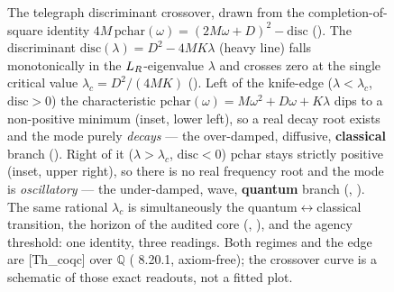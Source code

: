 \begin{figure}[t]
{%
}
\caption{The telegraph discriminant crossover, drawn from the completion-of-square
identity $4M\,\mathrm{pchar}(\omega)=(2M\omega+D)^2-\mathrm{disc}$ ().
The discriminant $\mathrm{disc}(\lambda)=D^2-4MK\lambda$ (heavy line) falls monotonically
in the $L_{R}$-eigenvalue $\lambda$ and crosses zero at the single critical value
$\lambda_c=D^2/(4MK)$ (). Left of the knife-edge
($\lambda<\lambda_c$, $\mathrm{disc}>0$) the characteristic $\mathrm{pchar}(\omega)=M\omega^2+D\omega+K\lambda$
dips to a non-positive minimum (inset, lower left), so a real decay root exists and the
mode purely \emph{decays} --- the over-damped, diffusive, \textbf{classical} branch
(). Right of it ($\lambda>\lambda_c$, $\mathrm{disc}<0$)
$\mathrm{pchar}$ stays strictly positive (inset, upper right), so there is no real
frequency root and the mode is \emph{oscillatory} --- the under-damped, wave,
\textbf{quantum} branch (, ).
The same rational $\lambda_c$ is simultaneously the quantum$\leftrightarrow$classical
transition, the horizon of the audited core (,
), and the agency threshold: one identity, three
readings. Both regimes and the edge are \textsf{[Th\_coqc]} over $\mathbb{Q}$ (
8.20.1, axiom-free); the crossover curve is a schematic of those exact readouts, not a
fitted plot.}
\label{fig:crossover}
\end{figure}
